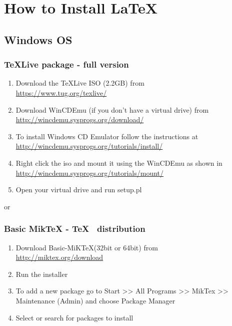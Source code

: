 \chapter{How to Install \LaTeX}

\section*{Windows OS}

\subsection*{TeXLive package - full version}
\begin{enumerate}
	\item	Download the TeXLive ISO (2.2GB) from\\
	      \href{https://www.tug.org/texlive/}{https://www.tug.org/texlive/}
	\item	Download WinCDEmu (if you don't have a virtual drive) from \\
	      \href{http://wincdemu.sysprogs.org/download/}
	      {http://wincdemu.sysprogs.org/download/}
	\item	To install Windows CD Emulator follow the instructions at\\
	      \href{http://wincdemu.sysprogs.org/tutorials/install/}
	      {http://wincdemu.sysprogs.org/tutorials/install/}
	\item	Right click the iso and mount it using the WinCDEmu as shown in \\
	      \href{http://wincdemu.sysprogs.org/tutorials/mount/}{
		      http://wincdemu.sysprogs.org/tutorials/mount/}
	\item	Open your virtual drive and run setup.pl
\end{enumerate}

or

\subsection*{Basic MikTeX - \TeX~ distribution}
\begin{enumerate}
	\item	Download Basic-MiK\TeX (32bit or 64bit) from\\
	      \href{http://miktex.org/download}{http://miktex.org/download}
	\item	Run the installer
	\item	To add a new package go to Start >> All Programs >> MikTex >> Maintenance (Admin) and choose Package Manager
	\item	Select or search for packages to install
\end{enumerate}

